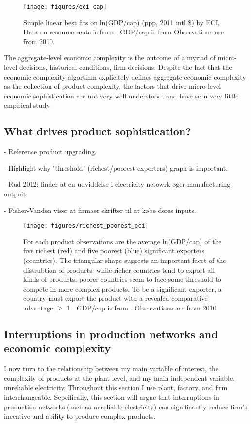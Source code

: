 \documentclass[11pt]{article}
\begin{document}
\begin{figure}[htpb]
	\centering
	\texttt{[image: figures/eci\_cap]}
	\caption{Simple linear best fits on ln(GDP/cap) (ppp, 2011 intl \$) by ECI. Data on resource rents is from \cite{world_bank_world_2020}, GDP/cap is from \cite{world_bank_world_2020-1} Observations are from 2010.}
	\label{fig:framework-eci-gdp}
\end{figure}

The aggregate-level economic complexity is the outcome of a myriad of micro-level decisions, historical conditions, firm decisions. Despite the fact that the economic complexity algortihm explicitely defines aggregate economic complexity as the collection of product complexity, the factors that drive micro-level economic sophistication are not very well understood, and have seen very little empirical study.

\subsection{What drives product sophistication?}%
\label{sub:what_drives_product_sophistication_}

- Reference product upgrading.

- Highlight why "threshold" (richest/poorest exporters) graph is important.

- Rud 2012: finder at en udviddelse i electricity netowrk øger manufacturing outpuit

- Fisher-Vanden viser at firmaer skrifter til at købe deres inputs. 


\begin{figure}[htpb]
	\centering
	\texttt{[image: figures/richest\_poorest\_pci]}
	\caption{For each product observations are the average ln(GDP/cap) of the five richest (red) and five poorest (blue) significant exporters (countries). The triangular shape suggests an important facet of the distrubtion of products: while richer countries tend to export all kinds of products, poorer countries seem to face some threshold to compete in more complex products. To be a significant exporter, a country must export the product with a revealed comparative advantage \(\geq\) 1  \citep{balassa_trade_1965}. GDP/cap is from \cite{world_bank_world_2020-1}. Observations are from 2010.}%
	\label{fig:framework-least-most}
\end{figure}


\subsection{Interruptions in production networks and economic complexity}
\label{sec:production_networks}
I now turn to the relationship between my main variable of interest, the complexity of products at the plant level, and my main independent variable, unreliable electricity. Throughout this section I use plant, factory, and firm interchangeable. Sepcifically, this section will argue that interruptions in production networks (such as unreliable electricity) can significantly reduce firm's incentive and ability to produce complex products.
\end{document}
